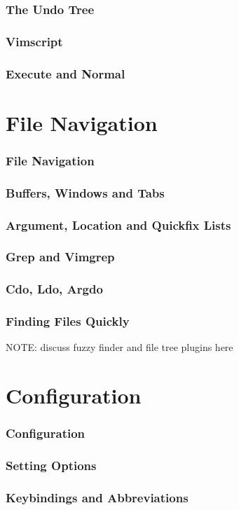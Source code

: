 \documentclass{beamer}
\begin{document}
\begin{frame}
    \frametitle{The Undo Tree}
\end{frame}

\begin{frame}
    \frametitle{Vimscript}
\end{frame}

\begin{frame}
    \frametitle{Execute and Normal}
\end{frame}

\section{File Navigation}

\begin{frame}
    \frametitle{File Navigation}
    \tableofcontents[currentsection]
\end{frame}

\begin{frame}
    \frametitle{Buffers, Windows and Tabs}
\end{frame}

\begin{frame}
    \frametitle{Argument, Location and Quickfix Lists}
\end{frame}

\begin{frame}
    \frametitle{Grep and Vimgrep}
\end{frame}

\begin{frame}
    \frametitle{Cdo, Ldo, Argdo}
\end{frame}

\begin{frame}
    \frametitle{Finding Files Quickly}
    NOTE: discuss fuzzy finder and file tree plugins here
\end{frame}

\section{Configuration}

\begin{frame}
    \frametitle{Configuration}
    \tableofcontents[currentsection]
\end{frame}

\begin{frame}
    \frametitle{Setting Options}
\end{frame}

\begin{frame}
    \frametitle{Keybindings and Abbreviations}
\end{frame}
\end{document}
